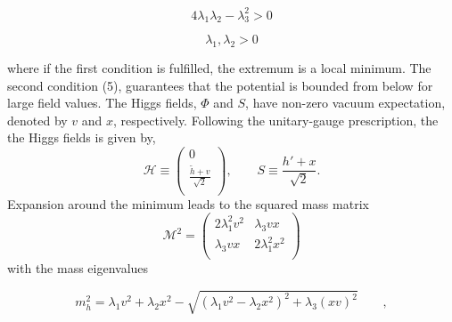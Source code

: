 \begin{equation}
 4 \lambda_1  \lambda_2 - \lambda_3^2 >0    \end{equation}

\begin{equation}
 \lambda_1 , \lambda_2  >0    \end{equation}

where if the first condition is fulfilled, the extremum is a local minimum. The
second condition (5), guarantees that the potential is bounded from below for large field values.
The Higgs fields, $\Phi$ and $S$, have non-zero vacuum expectation, denoted by $v$ and $x$, respectively.
Following the unitary-gauge prescription, the the Higgs fields is given by,
\newline
$$
{\mathcal H} \equiv \left(
\begin{array}{c}
0  \\
\frac{\tilde{h}+v }{\sqrt{2}}  \\
\end{array}
\right)
, \qquad 
S \equiv \frac{h'+x }{\sqrt{2}}
.
$$
Expansion around the minimum leads to the squared mass matrix
\newline
$$
{\mathcal M}^2 = \left(
\begin{array}{cc}
2 \lambda_1^2 v^2 & \lambda_3 vx  \\
\lambda_3 vx & 2 \lambda_1^2 x^2 \\

\end{array}
\right)
$$
\newline
with the mass eigenvalues

\begin{equation}
 m_h^2=  \lambda_1 v^2 + \lambda_2 x^2 -\sqrt{(\lambda_1 v^2 - \lambda_2 x^2)^2 +\lambda_3 (xv)^2 } \qquad,  \end{equation}

